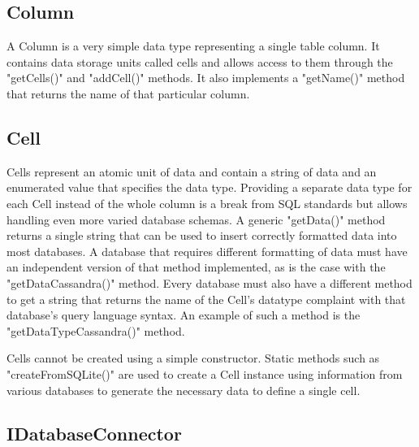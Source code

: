 \subsection{Column}




\par A Column is a very simple data type representing a single table column. It contains data storage units called cells and allows access to them through the "getCells()" and "addCell()" methods. It also implements a "getName()" method that returns the name of that particular column.

\subsection{Cell}




\par Cells represent an atomic unit of data and contain a string of data and an enumerated value that specifies the data type. Providing a separate data type for each Cell instead of the whole column is a break from SQL standards but allows handling even more varied database schemas. A generic "getData()" method returns a single string that can be used to insert correctly formatted data into most databases. A database that requires different formatting of data must have an independent version of that method implemented, as is the case with the "getDataCassandra()" method. Every database must also have a different method to get a string that returns the name of the Cell's datatype complaint with that database's query language syntax. An example of such a method is the "getDataTypeCassandra()" method. 
\par Cells cannot be created using a simple constructor. Static methods such as "createFromSQLite()" are used to create a Cell instance using information from various databases to generate the necessary data to define a single cell.

\subsection{IDatabaseConnector}



